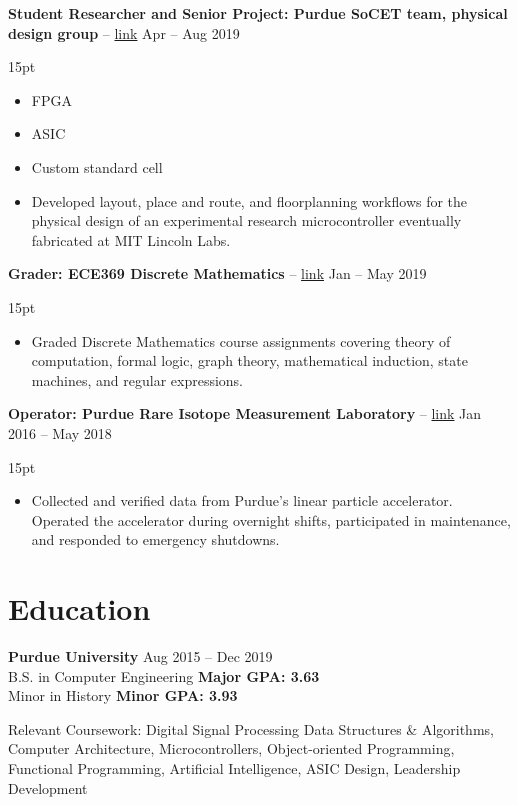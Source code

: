 \documentclass[10pt,letterpaper]{article}
\newcommand{\resumeItem}[4]{
	\begingroup
	\def\link{#2}
	\textbf{#1}
	\ifx\link\empty \else 
		-- \href{#2}{link}
	\fi
	\hfill #3\\
	\begin{adjustwidth}{15pt}{}
	#4
	\end{adjustwidth}
	\endgroup
}
\begin{document}
\resumeItem
{Student Researcher and Senior Project: Purdue SoCET team, physical design group}
{}
{Apr -- Aug 2019}
{
\begin{itemize}
	\item FPGA
	\item ASIC
	\item Custom standard cell
	\item Developed layout, place and route, and floorplanning workflows for the physical design of an experimental research microcontroller eventually fabricated at MIT Lincoln Labs.
\end{itemize}
}

\resumeItem
{Grader: ECE369 Discrete Mathematics}
{}
{Jan -- May 2019}
{
\begin{itemize}
	\item Graded Discrete Mathematics course assignments covering theory of computation, formal logic, graph theory, mathematical induction, state machines, and regular expressions.
\end{itemize}
}

\resumeItem
{Operator: Purdue Rare Isotope Measurement Laboratory}
{}
{Jan 2016 -- May 2018}
{
\begin{itemize}
	\item Collected and verified data from Purdue's linear particle accelerator. Operated the accelerator during overnight shifts, participated in maintenance, and responded to emergency shutdowns.
\end{itemize}
}

\section*{Education}
\textbf{Purdue University} \hfill Aug 2015 -- Dec 2019 \\
B.S. in Computer Engineering \textbf{Major GPA: 3.63} \\
Minor in History \textbf{Minor GPA: 3.93}

\vspace{2pt}
Relevant Coursework:
Digital Signal Processing
Data Structures \& Algorithms,
Computer Architecture,
Microcontrollers,
Object-oriented Programming,
Functional Programming,
Artificial Intelligence,
ASIC Design,
Leadership Development
\end{document}
